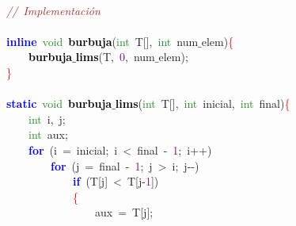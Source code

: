 \mbox{} \\
\mbox{}\textit{\textcolor{Brown}{//\ Implementación}} \\
\mbox{} \\
\mbox{}\textbf{\textcolor{Blue}{inline}}\ \textcolor{ForestGreen}{void}\ \textbf{\textcolor{Black}{burbuja}}\textcolor{BrickRed}{(}\textcolor{ForestGreen}{int}\ T\textcolor{BrickRed}{[],}\ \textcolor{ForestGreen}{int}\ num$\_$elem\textcolor{BrickRed}{)}\textcolor{Red}{\{} \\
\mbox{}\ \ \ \ \textbf{\textcolor{Black}{burbuja$\_$lims}}\textcolor{BrickRed}{(}T\textcolor{BrickRed}{,}\ \textcolor{Purple}{0}\textcolor{BrickRed}{,}\ num$\_$elem\textcolor{BrickRed}{);} \\
\mbox{}\textcolor{Red}{\}} \\
\mbox{} \\
\mbox{}\textbf{\textcolor{Blue}{static}}\ \textcolor{ForestGreen}{void}\ \textbf{\textcolor{Black}{burbuja$\_$lims}}\textcolor{BrickRed}{(}\textcolor{ForestGreen}{int}\ T\textcolor{BrickRed}{[],}\ \textcolor{ForestGreen}{int}\ inicial\textcolor{BrickRed}{,}\ \textcolor{ForestGreen}{int}\ final\textcolor{BrickRed}{)}\textcolor{Red}{\{} \\
\mbox{}\ \ \ \ \textcolor{ForestGreen}{int}\ i\textcolor{BrickRed}{,}\ j\textcolor{BrickRed}{;} \\
\mbox{}\ \ \ \ \textcolor{ForestGreen}{int}\ aux\textcolor{BrickRed}{;} \\
\mbox{}\ \ \ \ \textbf{\textcolor{Blue}{for}}\ \textcolor{BrickRed}{(}i\ \textcolor{BrickRed}{=}\ inicial\textcolor{BrickRed}{;}\ i\ \textcolor{BrickRed}{\textless{}}\ final\ \textcolor{BrickRed}{-}\ \textcolor{Purple}{1}\textcolor{BrickRed}{;}\ i\textcolor{BrickRed}{++)} \\
\mbox{}\ \ \ \ \ \ \ \ \textbf{\textcolor{Blue}{for}}\ \textcolor{BrickRed}{(}j\ \textcolor{BrickRed}{=}\ final\ \textcolor{BrickRed}{-}\ \textcolor{Purple}{1}\textcolor{BrickRed}{;}\ j\ \textcolor{BrickRed}{\textgreater{}}\ i\textcolor{BrickRed}{;}\ j\textcolor{BrickRed}{-\/-)} \\
\mbox{}\ \ \ \ \ \ \ \ \ \ \ \ \textbf{\textcolor{Blue}{if}}\ \textcolor{BrickRed}{(}T\textcolor{BrickRed}{[}j\textcolor{BrickRed}{]}\ \textcolor{BrickRed}{\textless{}}\ T\textcolor{BrickRed}{[}j\textcolor{BrickRed}{-}\textcolor{Purple}{1}\textcolor{BrickRed}{])} \\
\mbox{}\ \ \ \ \ \ \ \ \ \ \ \ \textcolor{Red}{\{} \\
\mbox{}\ \ \ \ \ \ \ \ \ \ \ \ \ \ \ \ aux\ \textcolor{BrickRed}{=}\ T\textcolor{BrickRed}{[}j\textcolor{BrickRed}{];} \\
